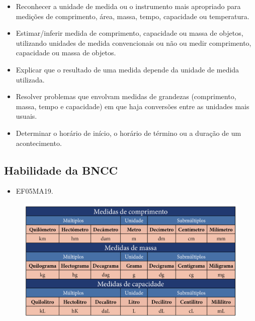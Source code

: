 \begin{itemize}
\item Reconhecer a unidade de medida ou o instrumento mais apropriado para
medições de comprimento, área, massa, tempo, capacidade ou temperatura.

\item Estimar/inferir medida de comprimento, capacidade ou massa de objetos,
utilizando unidades de medida convencionais ou não ou medir comprimento,
capacidade ou massa de objetos.

\item Explicar que o resultado de uma medida depende da unidade de medida utilizada.

\item Resolver problemas que envolvam medidas de grandezas (comprimento,
massa, tempo e capacidade) em que haja conversões entre as unidades mais
usuais.

\item Determinar o horário de início, o horário de término ou a duração de
um acontecimento.
\end{itemize}

\subsection{Habilidade da BNCC}

\begin{itemize}
\item EF05MA19.
\end{itemize}


\begin{figure}[htpb!]
\includegraphics[width=\textwidth]{../ilustracoes/MAT5/SAEB_5ANO_MAT_figura30_1.png}
\end{figure}

